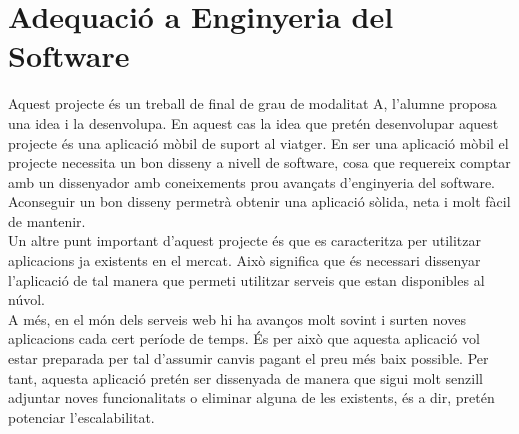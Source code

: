 \section{Adequació a Enginyeria del Software}

Aquest projecte és un treball de final de grau de modalitat A, l’alumne proposa una idea i la desenvolupa. En aquest cas la idea que pretén desenvolupar aquest projecte és una aplicació mòbil de suport al viatger. En ser una aplicació mòbil el projecte necessita un bon disseny a nivell de software, cosa que requereix comptar amb un dissenyador amb coneixements prou avançats d’enginyeria del software. Aconseguir un bon disseny permetrà obtenir una aplicació sòlida, neta i molt fàcil de
mantenir.\\

Un altre punt important d’aquest projecte és que es caracteritza per utilitzar aplicacions ja existents en el mercat. Això significa que és necessari dissenyar l’aplicació de tal manera que permeti utilitzar serveis que estan disponibles al núvol.\\

A més, en el món dels serveis web hi ha avanços molt sovint i surten noves
aplicacions cada cert període de temps. És per això que aquesta aplicació vol estar preparada per tal d’assumir canvis pagant el preu més baix possible. Per tant, aquesta aplicació pretén ser dissenyada de manera que sigui molt senzill adjuntar noves funcionalitats o eliminar alguna de les existents, és a dir, pretén potenciar l’escalabilitat.

